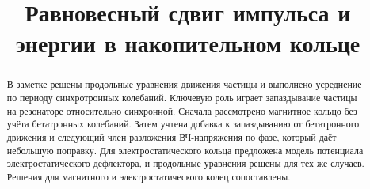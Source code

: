 \documentclass[a4paper,11pt]{article}
\title{Равновесный сдвиг импульса и энергии в накопительном кольце}
\author{}
\date{}
\begin{document}
\maketitle

\begin{abstract}
В заметке решены продольные уравнения движения частицы и выполнено усреднение по периоду синхротронных колебаний. Ключевую роль играет запаздывание частицы на резонаторе относительно синхронной. Сначала рассмотрено магнитное кольцо без учёта бетатронных колебаний. Затем учтена добавка к запаздыванию от бетатронного движения и следующий член разложения ВЧ-напряжения по фазе, который даёт небольшую поправку. Для электростатического кольца предложена модель потенциала электростатического дефлектора, и продольные уравнения решены для тех же случаев. Решения для магнитного и электростатического колец сопоставлены.
\end{abstract}

\tableofcontents

\clearpage


\clearpage


\clearpage


\clearpage


\clearpage


\clearpage


\clearpage
\appendix


\clearpage


\end{document}
